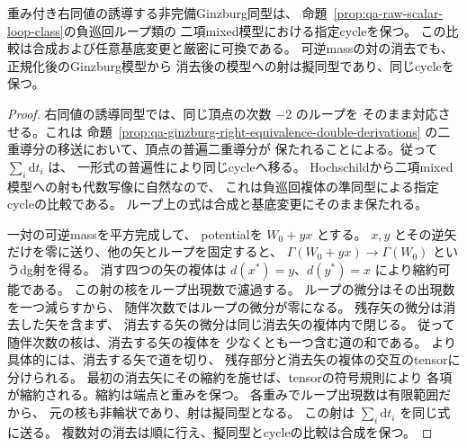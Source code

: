 \begin{corollary}[rawループ鎖の右同値と可縮対消去]
\label{cor:qa-raw-loop-class-naturality}
重み付き右同値の誘導する非完備Ginzburg同型は、
命題~\ref{prop:qa-raw-scalar-loop-class}の負巡回ループ類の
二項mixed模型における指定cycleを保つ。
この比較は合成および任意基底変更と厳密に可換である。
可逆massの対の消去でも、正規化後のGinzburg模型から
消去後の模型への射は擬同型であり、同じcycleを保つ。
\end{corollary}
\begin{proof}
右同値の誘導同型では、同じ頂点の次数 $-2$ のループを
そのまま対応させる。これは
命題~\ref{prop:qa-ginzburg-right-equivalence-double-derivations}
の二重導分の移送において、頂点の普遍二重導分が
保たれることによる。従って $\sum_i\mathrm d t_i$ は、
一形式の普遍性により同じcycleへ移る。
Hochschildから二項mixed模型への射も代数写像に自然なので、
これは負巡回複体の準同型による指定cycleの比較である。
ループ上の式は合成と基底変更にそのまま保たれる。

一対の可逆massを平方完成して、
potentialを $W_0+yx$ とする。
$x,y$ とその逆矢だけを零に送り、他の矢とループを固定すると、
$\Gamma(W_0+yx)\to\Gamma(W_0)$ というdg射を得る。
消す四つの矢の複体は
$d(x^*)=y$、$d(y^*)=x$ により縮約可能である。
この射の核をループ出現数で濾過する。
ループの微分はその出現数を一つ減らすから、
随伴次数ではループの微分が零になる。
残存矢の微分は消去した矢を含まず、
消去する矢の微分は同じ消去矢の複体内で閉じる。
従って随伴次数の核は、消去する矢の複体を
少なくとも一つ含む道の和である。
より具体的には、消去する矢で道を切り、
残存部分と消去矢の複体の交互のtensorに分けられる。
最初の消去矢にその縮約を施せば、tensorの符号規則により
各項が縮約される。縮約は端点と重みを保つ。
各重みでループ出現数は有限範囲だから、
元の核も非輪状であり、射は擬同型となる。
この射は $\sum_i\mathrm d t_i$ を同じ式に送る。
複数対の消去は順に行え、擬同型とcycleの比較は合成を保つ。
\end{proof}

